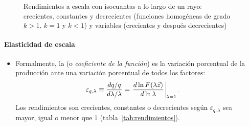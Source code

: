 \documentclass[11pt]{article}
\begin{document}
\begin{figure}[H]
\centering
\caption{Rendimientos a escala con isocuantas a lo largo de un rayo: crecientes, constantes y decrecientes (funciones homogéneas de grado $k>1$, $k=1$ y $k<1$) y variables (crecientes y después decrecientes)}\label{fig:rendimientos-escala-isocuantas}
\end{figure}

\paragraph{Elasticidad de escala}

\begin{itemize}
\item Formalmente, la  (o \emph{coeficiente de la función}) es la variación porcentual de la producción ante una variación porcentual de todos los factores:
  \begin{equation}
  \varepsilon_{q,\lambda}\equiv\frac{dq/q}{d\lambda/\lambda}=\left.\frac{d\ln F(\lambda\vec{z})}{d\ln\lambda}\right|_{\lambda=1}. \label{eq:elasticidad-escala}
  \end{equation}
  Los rendimientos son crecientes, constantes o decrecientes según $\varepsilon_{q,\lambda}$ sea mayor, igual o menor que 1 (tabla~\ref{tab:rendimientos}).
\end{itemize}
\end{document}
